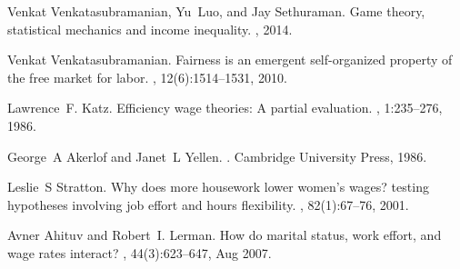 \documentclass[letterpaper,english,10pt]{article}
\begin{document}
  \begin{thebibliography}{9}
  	
  	Venkat Venkatasubramanian, Yu~Luo, and Jay Sethuraman.
  	\newblock Game theory, statistical mechanics and income inequality.
  	, 2014.
  	
  	Venkat Venkatasubramanian.
  	\newblock Fairness is an emergent self-organized property of the free market
  	for labor.
  	, 12(6):1514--1531, 2010.
  	
    Lawrence~F. Katz.
    \newblock Efficiency wage theories: A partial evaluation.
    , 1:235--276, 1986.
  	
  	George~A Akerlof and Janet~L Yellen.
  	.
  	\newblock Cambridge University Press, 1986.
  	
  
  	
  	
  	
  	Leslie~S Stratton.
  	\newblock Why does more housework lower women's wages? testing hypotheses
  	involving job effort and hours flexibility.
  	, 82(1):67--76, 2001.
  	
  	Avner Ahituv and Robert~I. Lerman.
  	\newblock How do marital status, work effort, and wage rates interact?
  	, 44(3):623--647, Aug 2007.
  	
  	
  	
  \end{thebibliography}
 
 
 

 

 
\end{document}

